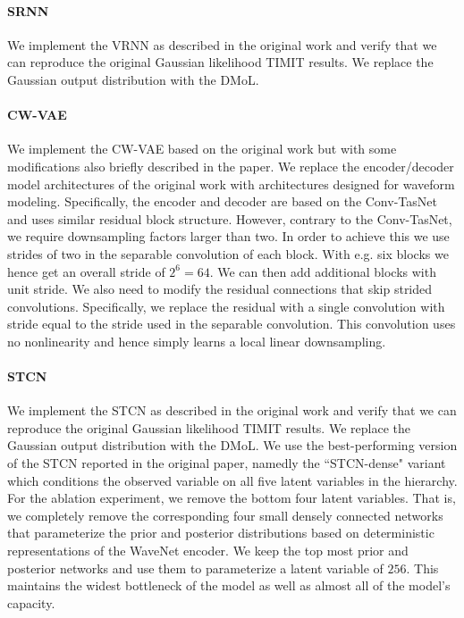{\paragraph{SRNN}
We implement the VRNN as described in the original work \cite{fraccaro_sequential_2016} and verify that we can reproduce the original Gaussian likelihood TIMIT results. We replace the Gaussian output distribution with the DMoL. 

\paragraph{CW-VAE} We implement the CW-VAE based on the original work \cite{saxena_clockwork_2021} but with some modifications also briefly described in the paper. We replace the encoder/decoder model architectures of the original work with architectures designed for waveform modeling. Specifically, the encoder and decoder are based on the Conv-TasNet \cite{luo_conv-tasnet_2019} and uses similar residual block structure. However, contrary to the Conv-TasNet, we require downsampling factors larger than two. In order to achieve this we use strides of two in the separable convolution of each block. With e.g. six blocks we hence get an overall stride of $2^6=64$. We can then add additional blocks with unit stride.
We also need to modify the residual connections that skip strided convolutions. Specifically, we replace the residual with a single convolution with stride equal to the stride used in the separable convolution. This convolution uses no nonlinearity and hence simply learns a local linear downsampling.

\paragraph{STCN} We implement the STCN as described in the original work \cite{aksan_stcn_2019} and verify that we can reproduce the original Gaussian likelihood TIMIT results. We replace the Gaussian output distribution with the DMoL. We use the best-performing version of the STCN reported in the original paper, namedly the ``STCN-dense" variant which conditions the observed variable on all five latent variables in the hierarchy. For the ablation experiment, we remove the bottom four latent variables. That is, we completely remove the corresponding four small densely connected networks that parameterize the prior and posterior distributions based on deterministic representations of the WaveNet encoder. We keep the top most prior and posterior networks and use them to parameterize a latent variable of $256$. This maintains the widest bottleneck of the model as well as almost all of the model's capacity.

}

